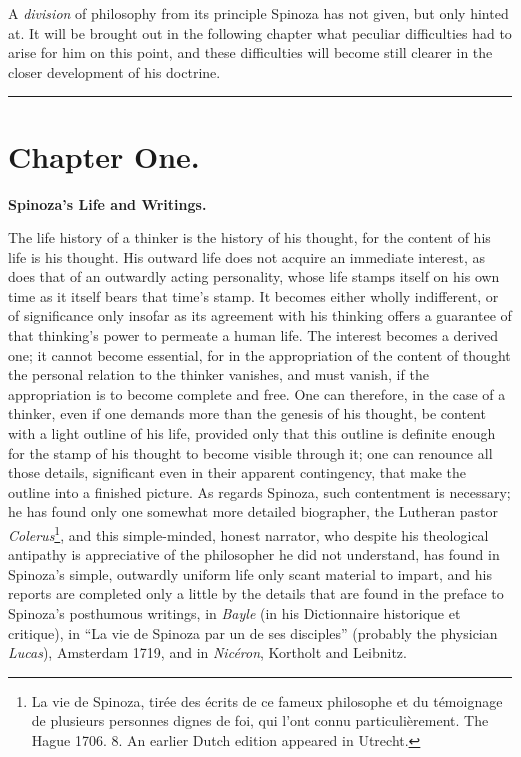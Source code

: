 \documentclass[12pt,a4paper,openany]{book}
\newcommand{\opage}[1]{\marginnote{\footnotesize\textit{[#1]}}}
\begin{document}
A \emph{division} of philosophy from its principle Spinoza has not
given, but only hinted at. It will be brought out in the following
chapter what peculiar difficulties had to arise for him on this point,
and these difficulties will become still clearer in the closer
development of his doctrine.

\bigskip
\begin{center}\rule{2.5cm}{0.4pt}\end{center}

\newpage

\chapter*{Chapter One.}

\begin{center}
\textbf{Spinoza's Life and Writings.}
\end{center}

\opage{27}\setcounter{footnote}{0}The life history of a thinker is the history
of his thought, for the content of his life is his thought. His outward
life does not acquire an immediate interest, as does that of an
outwardly acting personality, whose life stamps itself on his own time
as it itself bears that time's stamp. It becomes either wholly
indifferent, or of significance only insofar as its agreement with his
thinking offers a guarantee of that thinking's power to permeate a human
life. The interest becomes a derived one; it cannot become essential,
for in the appropriation of the content of thought the personal relation
to the thinker vanishes, and must vanish, if the appropriation is to
become complete and free. One can therefore, in the case of a thinker,
even if one demands more than the genesis of his thought, be content
with a light outline of his life, provided only that this outline is
definite enough for the stamp of his thought to become visible through
it; one can renounce all those details, significant even in their
apparent contingency, that make the outline into a finished picture. As
regards Spinoza, such contentment is necessary; he has found only one
somewhat more detailed biographer, the Lutheran pastor
\emph{Colerus}\footnote{La vie de Spinoza, tirée des écrits de ce fameux
philosophe et du témoignage de plusieurs personnes dignes de foi, qui
l'ont connu particulièrement. The Hague 1706. 8. An earlier Dutch
edition appeared in Utrecht.},
\opage{28}and this simple-minded, honest narrator, who despite his
theological antipathy is appreciative of the philosopher he did not
understand, has found in Spinoza's simple, outwardly uniform life only
scant material to impart, and his reports are completed only a little by
the details that are found in the preface to Spinoza's posthumous
writings, in \emph{Bayle} (in his Dictionnaire historique et critique),
in ``La vie de Spinoza par un de ses disciples'' (probably the physician
\emph{Lucas}), Amsterdam 1719, and in \emph{Nicéron}, Kortholt and
Leibnitz.
\end{document}
